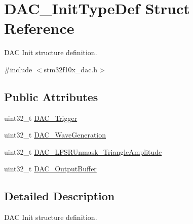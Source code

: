 \hypertarget{structDAC__InitTypeDef}{
\section{DAC\_\-InitTypeDef Struct Reference}
\label{structDAC__InitTypeDef}
}


DAC Init structure definition.  




{\ttfamily \#include $<$stm32f10x\_\-dac.h$>$}

\subsection*{Public Attributes}
\begin{DoxyCompactItemize}
\item 
uint32\_\-t \hyperlink{structDAC__InitTypeDef_a7b26ebaeb51a0157a781f7de8ba779e5}{DAC\_\-Trigger}
\item 
uint32\_\-t \hyperlink{structDAC__InitTypeDef_a6753e78ddd2dc8273444ba01a272d63a}{DAC\_\-WaveGeneration}
\item 
uint32\_\-t \hyperlink{structDAC__InitTypeDef_a27ed27a544d50781b20d59cc55e6cef8}{DAC\_\-LFSRUnmask\_\-TriangleAmplitude}
\item 
uint32\_\-t \hyperlink{structDAC__InitTypeDef_ad3e9e01486443e99f19e65a446b03ca6}{DAC\_\-OutputBuffer}
\end{DoxyCompactItemize}


\subsection{Detailed Description}
DAC Init structure definition. 


